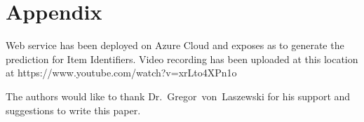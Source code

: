 \section{Appendix}

Web service has been deployed on Azure Cloud and exposes as to generate 
the prediction for Item Identifiers.
Video recording has been uploaded at this location at
https://www.youtube.com/watch?v=xrLto4XPn1o


\begin{acks}

  The authors would like to thank Dr.~Gregor~von~Laszewski for his
  support and suggestions to write this paper.

\end{acks}


 
